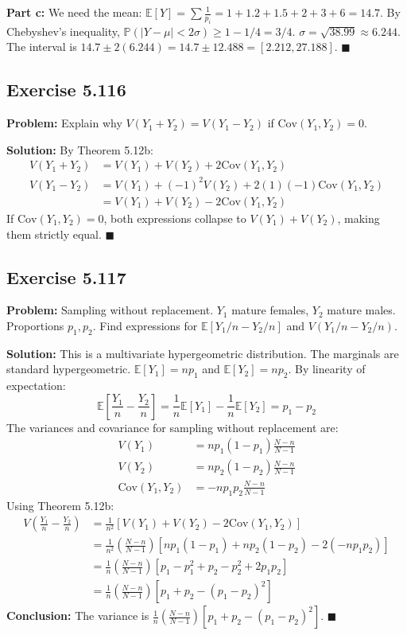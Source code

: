 \documentclass[11pt, a4paper]{article}
\theoremstyle{definition}
\theoremstyle{remark}
\newcommand{\E}{\mathbb{E}}
\newcommand{\Prob}{\mathbb{P}}
\begin{document}
\textbf{Part c:} We need the mean: $\E[Y] = \sum \frac{1}{p_i} = 1 + 1.2 + 1.5 + 2 + 3 + 6 = 14.7$.
By Chebyshev's inequality, $\Prob(|Y - \mu| < 2\sigma) \ge 1 - 1/4 = 3/4$.
$\sigma = \sqrt{38.99} \approx 6.244$.
The interval is $14.7 \pm 2(6.244) = 14.7 \pm 12.488 = [2.212, 27.188]$. $\blacksquare$

\subsection{Exercise 5.116}
\textbf{Problem:} Explain why $V(Y_1 + Y_2) = V(Y_1 - Y_2)$ if $\text{Cov}(Y_1, Y_2) = 0$.

\textbf{Solution:}
By Theorem 5.12b:
\begin{align*}
V(Y_1 + Y_2) &= V(Y_1) + V(Y_2) + 2\text{Cov}(Y_1, Y_2) \\
V(Y_1 - Y_2) &= V(Y_1) + (-1)^2 V(Y_2) + 2(1)(-1)\text{Cov}(Y_1, Y_2) \\
&= V(Y_1) + V(Y_2) - 2\text{Cov}(Y_1, Y_2)
\end{align*}
If $\text{Cov}(Y_1, Y_2) = 0$, both expressions collapse to $V(Y_1) + V(Y_2)$, making them strictly equal. $\blacksquare$

\subsection{Exercise 5.117}
\textbf{Problem:} Sampling without replacement. $Y_1$ mature females, $Y_2$ mature males. Proportions $p_1, p_2$. Find expressions for $\E[Y_1/n - Y_2/n]$ and $V(Y_1/n - Y_2/n)$.

\textbf{Solution:}
This is a multivariate hypergeometric distribution. The marginals are standard hypergeometric.
$\E[Y_1] = n p_1$ and $\E[Y_2] = n p_2$.
By linearity of expectation:
\[ \E\left[\frac{Y_1}{n} - \frac{Y_2}{n}\right] = \frac{1}{n}\E[Y_1] - \frac{1}{n}\E[Y_2] = p_1 - p_2 \]
The variances and covariance for sampling without replacement are:
\begin{align*}
V(Y_1) &= n p_1 (1-p_1) \frac{N-n}{N-1} \\
V(Y_2) &= n p_2 (1-p_2) \frac{N-n}{N-1} \\
\text{Cov}(Y_1, Y_2) &= -n p_1 p_2 \frac{N-n}{N-1}
\end{align*}
Using Theorem 5.12b:
\begin{align*}
V\left(\frac{Y_1}{n} - \frac{Y_2}{n}\right) &= \frac{1}{n^2} \left[ V(Y_1) + V(Y_2) - 2\text{Cov}(Y_1, Y_2) \right] \\
&= \frac{1}{n^2} \left( \frac{N-n}{N-1} \right) \left[ n p_1(1-p_1) + n p_2(1-p_2) - 2(-n p_1 p_2) \right] \\
&= \frac{1}{n} \left( \frac{N-n}{N-1} \right) \left[ p_1 - p_1^2 + p_2 - p_2^2 + 2p_1 p_2 \right] \\
&= \frac{1}{n} \left( \frac{N-n}{N-1} \right) \left[ p_1 + p_2 - (p_1 - p_2)^2 \right]
\end{align*}
\textbf{Conclusion:} The variance is $\frac{1}{n} \left( \frac{N-n}{N-1} \right) \left[ p_1 + p_2 - (p_1 - p_2)^2 \right]$. $\blacksquare$
\end{document}
